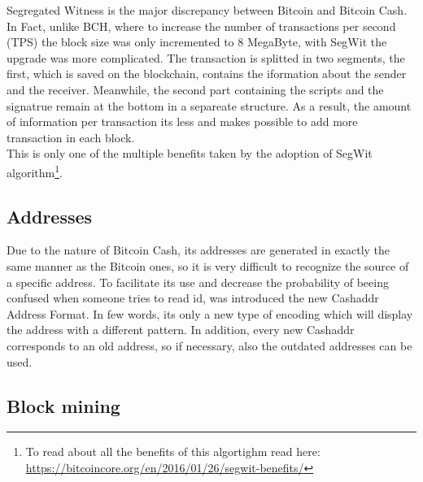 Segregated Witness is the major discrepancy between Bitcoin and Bitcoin Cash. In Fact,
unlike BCH, where to increase the number of transactions per second (TPS)
the block size was only incremented to 8 MegaByte, with SegWit the upgrade was more 
complicated. The transaction is splitted in two segments, the first, which is saved 
on the blockchain, contains the iformation about the sender and the receiver. 
Meanwhile, the second part containing the scripts and the signatrue remain at the 
bottom in a separeate structure. As a result, the amount of information per transaction
its less and makes possible to add more transaction in each block.\\
This is only one of the multiple benefits taken by the adoption of SegWit 
algorithm\footnote{To read about all the benefits of this algortighm read here:
 \url{https://bitcoincore.org/en/2016/01/26/segwit-benefits/}}.

\subsection{Addresses}
\label{sec:addresses}

Due to the nature of Bitcoin Cash, its addresses are generated in exactly the same 
manner as the Bitcoin ones, so it is very difficult to recognize the source of 
a specific address. To facilitate its use and decrease the probability of beeing 
confused when someone tries to read id, was introduced the new Cashaddr Address 
Format. In few words, its only a new type of encoding which will display the 
address with a different pattern. In addition, every new Cashaddr corresponds to 
an old address, so if necessary, also the outdated addresses can be used.

\subsection{Block mining}
\label{sec:mining}

